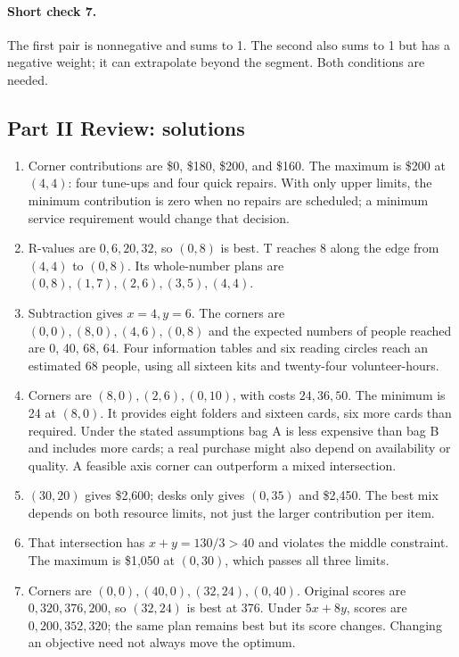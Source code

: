 \documentclass[11pt,letterpaper]{article}
\begin{document}
{\paragraph{Short check 7.}
The first pair is nonnegative and sums to 1. The second also sums to 1 but has a negative weight; it can extrapolate beyond the segment. Both conditions are needed.



\subsection*{Part II Review: solutions}
\begin{enumerate}
\item Corner contributions are \$0, \$180, \$200, and \$160. The maximum is \$200 at $(4,4)$: four tune-ups and four quick repairs. With only upper limits, the minimum contribution is zero when no repairs are scheduled; a minimum service requirement would change that decision.
\item R-values are $0,6,20,32$, so $(0,8)$ is best. T reaches 8 along the edge from $(4,4)$ to $(0,8)$. Its whole-number plans are $(0,8),(1,7),(2,6),(3,5),(4,4)$.
\item Subtraction gives $x=4,y=6$. The corners are $(0,0),(8,0),(4,6),(0,8)$ and the expected numbers of people reached are 0, 40, 68, 64. Four information tables and six reading circles reach an estimated 68 people, using all sixteen kits and twenty-four volunteer-hours.
\item Corners are $(8,0),(2,6),(0,10)$, with costs $24,36,50$. The minimum is 24 at $(8,0)$. It provides eight folders and sixteen cards, six more cards than required. Under the stated assumptions bag A is less expensive than bag B and includes more cards; a real purchase might also depend on availability or quality. A feasible axis corner can outperform a mixed intersection.
\item $(30,20)$ gives \$2,600; desks only gives $(0,35)$ and \$2,450. The best mix depends on both resource limits, not just the larger contribution per item.
\item That intersection has $x+y=130/3>40$ and violates the middle constraint. The maximum is \$1,050 at $(0,30)$, which passes all three limits.
\item Corners are $(0,0),(40,0),(32,24),(0,40)$. Original scores are $0,320,376,200$, so $(32,24)$ is best at 376. Under $5x+8y$, scores are $0,200,352,320$; the same plan remains best but its score changes. Changing an objective need not always move the optimum.

\end{enumerate}}
\end{document}

